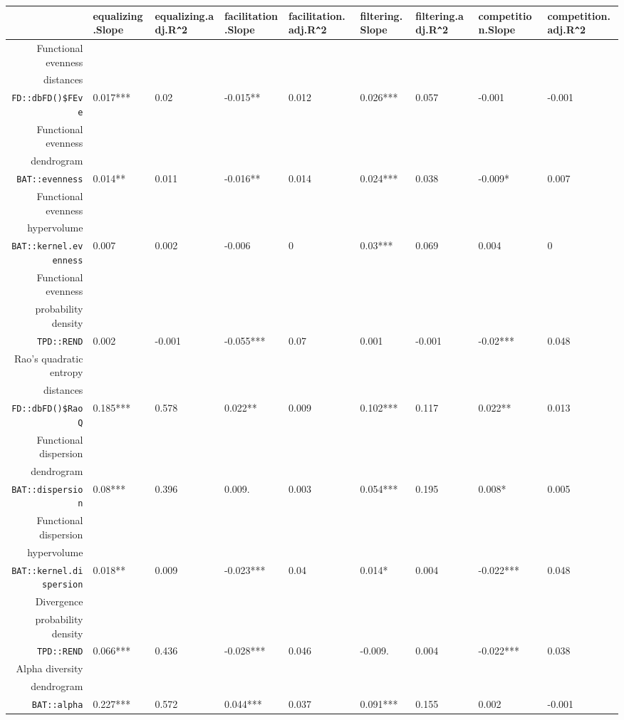 \begin{table}[ht]
\scriptsize
\centering
\begin{tabular}{rllllllll}
  \hline
 & equalizing.Slope & equalizing.adj.R\verb|^|2 & facilitation.Slope & facilitation.adj.R\verb|^|2 & filtering.Slope & filtering.adj.R\verb|^|2 & competition.Slope & competition.adj.R\verb|^|2 \\ 
  \hline
Functional evenness\\distances\\\texttt{FD::dbFD()\$FEve} & 0.017*** & 0.02 & -0.015** & 0.012 & 0.026*** & 0.057 & -0.001 & -0.001 \\ 
  Functional evenness\\dendrogram\\\texttt{BAT::evenness} & 0.014** & 0.011 & -0.016** & 0.014 & 0.024*** & 0.038 & -0.009* & 0.007 \\ 
  Functional evenness\\hypervolume\\\texttt{BAT::kernel.evenness} & 0.007 & 0.002 & -0.006 & 0 & 0.03*** & 0.069 & 0.004 & 0 \\ 
  Functional evenness\\probability density\\\texttt{TPD::REND} & 0.002 & -0.001 & -0.055*** & 0.07 & 0.001 & -0.001 & -0.02*** & 0.048 \\ 
  Rao's quadratic entropy\\distances\\\texttt{FD::dbFD()\$RaoQ} & 0.185*** & 0.578 & 0.022** & 0.009 & 0.102*** & 0.117 & 0.022** & 0.013 \\ 
  Functional dispersion\\dendrogram\\\texttt{BAT::dispersion} & 0.08*** & 0.396 & 0.009. & 0.003 & 0.054*** & 0.195 & 0.008* & 0.005 \\ 
  Functional dispersion\\hypervolume\\\texttt{BAT::kernel.dispersion} & 0.018** & 0.009 & -0.023*** & 0.04 & 0.014* & 0.004 & -0.022*** & 0.048 \\ 
  Divergence\\probability density\\\texttt{TPD::REND} & 0.066*** & 0.436 & -0.028*** & 0.046 & -0.009. & 0.004 & -0.022*** & 0.038 \\ 
  Alpha diversity\\dendrogram\\\texttt{BAT::alpha} & 0.227*** & 0.572 & 0.044*** & 0.037 & 0.091*** & 0.155 & 0.002 & -0.001 \\ 

\end{tabular}
\end{table}
